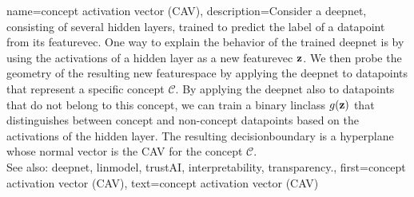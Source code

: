 {name={concept activation vector (CAV)},
	description={Consider a \gls{deepnet}, consisting  of several hidden \glspl{layer}, 
		trained to predict the \gls{label} of a \gls{datapoint} from its \gls{featurevec}. One way 
		to explain the behavior of the trained \gls{deepnet} is by using the \glspl{activation} of a 
		hidden \gls{layer} as a new \gls{featurevec} ${\bf z}$. We then probe the geometry of the 
		resulting new \gls{featurespace} by applying the \gls{deepnet} to \glspl{datapoint} 
		that represent a specific concept $\mathcal{C}$. By applying the \gls{deepnet} also to \glspl{datapoint} 
		that do not belong to this concept, we can train a binary \gls{linclass} $g({\bf z})$ that distinguishes 
		between concept and non-concept \glspl{datapoint} based on the \glspl{activation} of the hidden \gls{layer}. The resulting 
		\gls{decisionboundary} is a hyperplane whose normal \gls{vector} is the CAV for the concept $\mathcal{C}$. 
				\\
		 See also: \gls{deepnet}, \gls{linmodel}, \gls{trustAI}, \gls{interpretability}, \gls{transparency}.}, 
	first={concept activation vector (CAV)},
	text={concept activation vector (CAV)}
}


